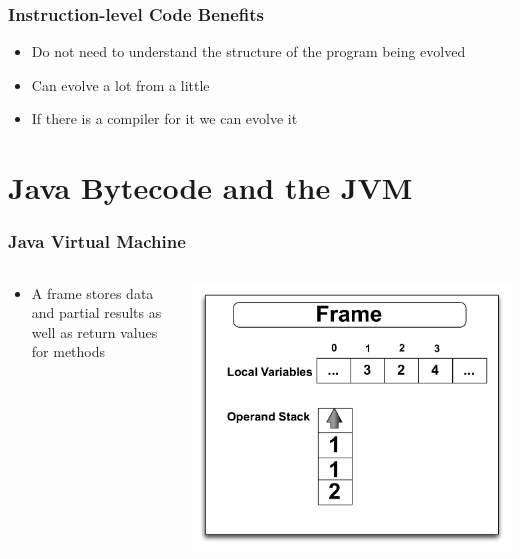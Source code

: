 \documentclass{beamer}
\begin{document}
\begin{frame}
	\frametitle{Instruction-level Code Benefits}
	\begin{itemize}
		\item Do not need to understand the structure of the program being evolved
		\item Can evolve a lot from a little
		\item If there is a compiler for it we can evolve it
	\end{itemize}		

\end{frame}


\section[Bytecode and Assembly]{Java Bytecode and the JVM}

\begin{frame}
	\frametitle{Java Virtual Machine}
\begin{columns}
\begin{column}{0.5\textwidth}
\begin{itemize}	
\item A frame stores data and partial results as well as return values for methods

\end{itemize}
\end{column}
\begin{column}{0.5\textwidth}
\includegraphics[width=1\textwidth]{Illustrations/frame.pdf}
\end{column}
\end{columns}



\end{frame}
\end{document}
